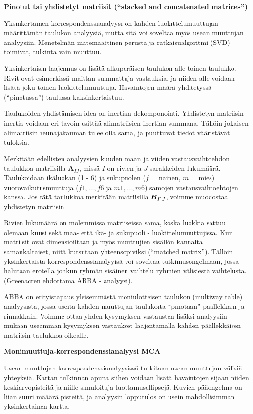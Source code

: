 \documentclass[
  finnish,
]{book}
\begin{document}
\textbf{Pinotut tai yhdistetyt matriisit (``stacked and concatenated matrices'')}

Yksinkertainen korrespondenssianalyysi on kahden luokittelumuuttujan määrittämän
taulukon analyysiä, mutta sitä voi soveltaa myös usean muuttujan analyysiin.
Menetelmän matemaattinen perusta ja ratkaisualgoritmi (SVD) toimivat, tulkinta
vain muuttuu.

Yksinkertaisin laajennus on lisätä alkuperäisen taulukon alle toinen taulukko.
Rivit ovat esimerkissä maittan summattuja vastauksia, ja niiden alle voidaan
lisätä joku toinen luokittelumuuttuja. Havaintojen määrä yhditetyssä (``pinotussa'')
taulussa kaksinkertaistuu.

Taulukoiden yhdistämisen idea on inertian dekomponointi. Yhdistetyn matriisin inertia
voidaan eri tavoin esittää alimatriisien inertian summana. Tällöin jokaisen alimatriisin
reunajakauman tulee olla sama, ja puuttuvat tiedot vääristävät tuloksia.

Merkitään edellisten analyysien kuuden maan ja viiden vastausvaihtoehdon
taulukkoa matriisilla \(\boldsymbol{ A}_{I J}\), missä \(I\) on rivien ja \(J\)
sarakkeiden lukumäärä. Taulukoidaan ikäluokan (1 - 6) ja sukupuolen (\(f\) = nainen,
\(m\) = mies) vuorovaikutusmuuttuja (\(f1,\dots , f6\) ja \(m1,\dots , m6\)) samojen
vastausvaihtoehtojen kanssa. Jos tätä taulukkoa merkitään matriisilla
\(\boldsymbol{ B}_{I^{`} J}\), voimme muodostaa yhdistetyn matriisin

Rivien lukumäärä on molemmissa matriiseissa sama, koska luokkia sattuu olemaan
kuusi sekä maa- että ikä- ja sukupuoli - luokittelumuuttujissa. Kun matriisit
ovat dimensioiltaan ja myös muuttujien sisällön kannalta samankaltaiset, niitä
kutsutaan yhteensopiviksi (``matched matrix''). Tällöin yksinkertaista
korrespondenssianalyyisä voi soveltaa tutkimusongelmaan, jossa halutaan erotella
jonkun ryhmän sisäinen vaihtelu ryhmien välisiestä vaihtelusta.
(Greenacren ehdottama ABBA - analyysi).

ABBA on erityistapaus yleisemmästä moniulotteisen taulukon (multiway table) analyysistä,
jossa useita kahden muuttujan taulukoita ``pinotaan'' päällekkäin ja rinnakkain.
Voimme ottaa yhden kysymyksen vastausten lisäksi analyysiin mukaan useamman
kysymyksen vastaukset laajentamalla kahden päällekkäisen matriisin taulukkoa oikealle.

\textbf{Monimuuttuja-korrespondenssianalyysi MCA}

Usean muuttujan korrespondenssianalyysissä tutkitaan usean muuttujan välisiä yhteyksiä.
Kartan tulkinnan apuna siihen voidaan lisätä havaintojen sijaan niiden keskiarvopisteitä
ja niille simuloituja luottamusellipsejä. Kuvien pääongelma on liian suuri määärä pisteitä,
ja analyysin lopputulos on usein mahdollisimman yksinkertainen kartta.
\end{document}
